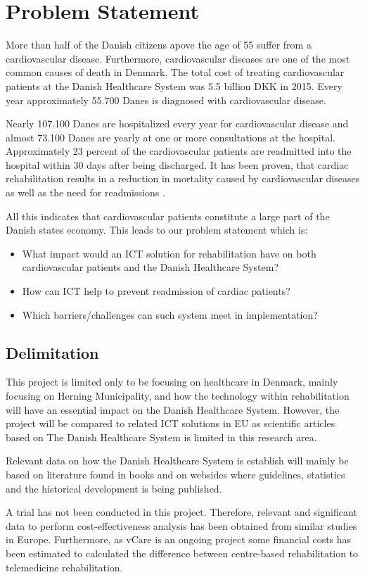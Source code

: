 \newpage
\section{Problem Statement}
More than half of the Danish citizens apove the age of 55 suffer from a cardiovascular disease. Furthermore, cardiovascular diseases are one of the most common causes of death in Denmark. The total cost of treating cardiovascular patients at the Danish Healthcare System was 5.5 billion DKK in 2015. Every year approximately 55.700 Danes is diagnosed with cardiovascular disease.   

Nearly 107.100 Danes are hospitalized every year for cardiovascular disease and almost 73.100 Danes are yearly at one or more consultations at the hospital. Approximately 23 percent of the cardiovascular patients are readmitted into the hospital within 30 days after being discharged. It has been proven, that cardiac rehabilitation results in a reduction in mortality caused by cardiovascular diseases as well as the need for readmissions \cite{Hjerteforening}.

All this indicates that cardiovascular patients constitute a large part of the Danish states economy. This leads to our problem statement which is:

\begin{itemize}
	\item What impact would an ICT solution for rehabilitation have on both cardiovascular patients and the Danish Healthcare System?
	\item How can ICT help to prevent readmission of cardiac patients?
	\item Which barriers/challenges can such system meet in implementation?
\end{itemize}

\subsection{Delimitation}
This project is limited only to be focusing on healthcare in Denmark, mainly focusing on Herning Municipality, and how the technology within rehabilitation will have an essential impact on the Danish Healthcare System. However, the project will be compared to related ICT solutions in EU as scientific articles based on The Danish Healthcare System is limited in this research area. 

Relevant data on how the Danish Healthcare System is establish will mainly be based on literature found in books and on websides where guidelines, statistics and the historical development is being published. 

A trial has not been conducted in this project. Therefore, relevant and significant data to perform cost-effectiveness analysis has been obtained from similar studies in Europe. Furthermore, as vCare is an ongoing project some financial costs has been estimated to calculated the difference between centre-based rehabilitation to telemedicine rehabilitation.      


